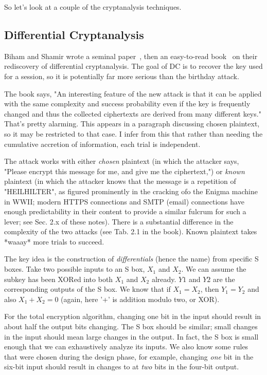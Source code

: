 \documentclass[%
 aip,
 jmp,%
 amsmath,amssymb,
 reprint,%
]{revtex4-1}
\begin{document}
So let's look at a couple of the cryptanalysis techniques.

\subsection{Differential Cryptanalysis}

Biham and Shamir wrote a seminal paper~\cite{biham1991differential},
then an easy-to-read book~\cite{biham1993differential-book} on their
rediscovery of differential cryptanalysis.  The goal of DC is to
recover the key used for a session, so it is potentially far more
serious than the birthday attack.

The book says, "An interesting feature of the new attack is that it
can be applied with the same complexity and success probability even
if the key is frequently changed and thus the collected ciphertexts
are derived from many different keys."  That's pretty alarming.  This
appears in a paragraph discussing chosen plaintext, so it may be
restricted to that case.  I infer from this that rather than needing
the cumulative accretion of information, each trial is independent.

The attack works with either \emph{chosen} plaintext (in which the attacker
says, "Please encrypt this message for me, and give me the
ciphertext,") or \emph{known} plaintext (in which the attacker knows that
the message is a repetition of "HEILHILTER", as figured prominently in
the cracking ofo the Enigma machine in WWII; modern HTTPS connections and
SMTP (email) connections have enough predictability in their content
to provide a similar fulcrum for such a lever; see Sec. 2.x of these
notes).  There is a substantial difference in the complexity of the
two attacks (see Tab. 2.1 in the book).  Known plaintext takes *waaay*
more trials to succeed.


The key idea is the construction of \emph{differentials} (hence the name)
from specific S boxes.  Take two possible inputs to an S box, $X_1$
and $X_2$.  We can assume the subkey has been XORed into both $X_1$
and $X_2$ already.  $Y1$ and $Y2$ are the corresponding outputs of the
S box.  We know that if $X_1 = X_2$, then $Y_1 = Y_2$ and also $X_1 +
X_2 = 0$ (again, here '+' is addition modulo two, or XOR).

For the total encryption algorithm, changing one bit in the input
should result in about half the output bits changing.  The S box
should be similar; small changes in the input should mean large
changes in the output.  In fact, the S box is small enough that we can
exhaustively analyze its inputs.  We also know some rules that were
chosen during the design phase, for example, changing \emph{one} bit in the
six-bit input should result in changes to at \emph{two} bits in the
four-bit output.
\end{document}
